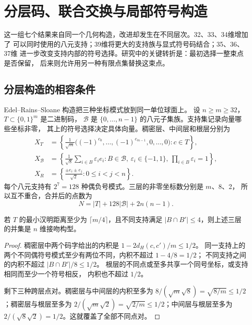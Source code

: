 \section{分层码、联合交换与局部符号构造}
\label{sec:codes}

这一组七个结果来自同一个几何构造，改进却发生在不同层次。32、33、34维增加了
可以同时使用的八元支持；39维将更大的支持族与显式符号码结合；35、36、37维
进一步改变支持内部的符号选择。研究中的关键转折是：最初选择一整束点是否保留，
后来则允许用另一种有限点集替换这束点。

\subsection{分层构造的相容条件}

Edel--Rains--Sloane 构造\cite{ers}把三种坐标模式放到同一单位球面上。
设 $n\ge m\ge32$，$T\subset\{0,1\}^m$ 是二进制码，
$\mathcal B$ 是 $\{0,\ldots,n-1\}$ 的八元子集族。支持集记录向量哪些坐标非零，
其上的符号选择决定具体向量。稠密层、中间层和根层分别为
\begin{align*}
X_T&=\left\{\frac{1}{\sqrt m}
 \bigl((-1)^{c_0},\ldots,(-1)^{c_{m-1}},0,\ldots,0\bigr):c\in T\right\},\\
X_{\mathcal B}&=\left\{\frac{1}{\sqrt8}\sum_{i\in B}\varepsilon_i e_i:
 B\in\mathcal B,\ \varepsilon_i\in\{-1,1\},\ \prod_{i\in B}\varepsilon_i=1\right\},\\
X_R&=\left\{\frac{\pm e_i\pm e_j}{\sqrt2}:0\le i<j<n\right\}.
\end{align*}
每个八元支持有 $2^7=128$ 种偶负号模式。三层的非零坐标数分别是 $m$、8、2，
所以互不重合，合并后的点数为
\begin{equation}
N=|T|+128|\mathcal B|+2n(n-1).
\label{eq:ers-count}
\end{equation}

\begin{proposition}
\label{prop:ers}
若 $T$ 的最小汉明距离至少为 $\lceil m/4\rceil$，且不同支持满足
$|B\cap B'|\le4$，则上述三层的并集是 $n$ 维接吻构型。
\end{proposition}
\begin{proof}
稠密层中两个码字给出的内积是 $1-2d_H(c,c')/m\le1/2$。
同一支持上的两个不同偶符号模式至少有两位不同，内积不超过 $1-4/8=1/2$；
不同支持之间的内积不超过 $|B\cap B'|/8\le1/2$。
根层的不同点或至多共享一个同号坐标，或支持相同而至少一个符号相反，
内积也不超过 $1/2$。

剩下三种跨层点对。稠密层与中间层的内积至多为
$8/(\sqrt m\sqrt8)=\sqrt{8/m}\le1/2$；稠密层与根层至多为
$2/(\sqrt m\sqrt2)=\sqrt{2/m}\le1/2$；中间层与根层至多为
$2/(\sqrt8\sqrt2)=1/2$。这就覆盖了全部不同点对。
\end{proof}

